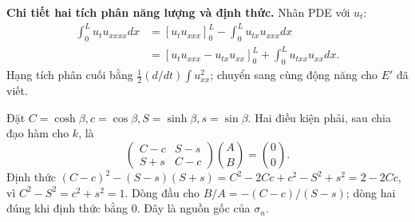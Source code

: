 \documentclass[10pt,a4paper]{article}
\begin{document}
\textbf{Chi tiết hai tích phân năng lượng và định thức.} Nhân PDE với $u_t$:
\[\begin{aligned}
\int_0^Lu_tu_{xxxx}dx
&=[u_tu_{xxx}]_0^L-\int_0^Lu_{tx}u_{xxx}dx\\
&=[u_tu_{xxx}-u_{tx}u_{xx}]_0^L+\int_0^Lu_{txx}u_{xx}dx.
\end{aligned}\]
Hạng tích phân cuối bằng $\frac12(d/dt)\int u_{xx}^2$; chuyển sang cùng động năng cho $E'$ đã viết.

Đặt $C=\cosh\beta,c=\cos\beta,S=\sinh\beta,s=\sin\beta$. Hai điều kiện phải, sau chia đạo hàm cho $k$, là
\[\begin{pmatrix}C-c&S-s\\S+s&C-c\end{pmatrix}\binom AB=\binom00.\]
Định thức $(C-c)^2-(S-s)(S+s)=C^2-2Cc+c^2-S^2+s^2=2-2Cc$, vì $C^2-S^2=c^2+s^2=1$. Dòng đầu cho $B/A=-(C-c)/(S-s)$; dòng hai đúng khi định thức bằng $0$. Đây là nguồn gốc của $\sigma_n$.
\end{document}
